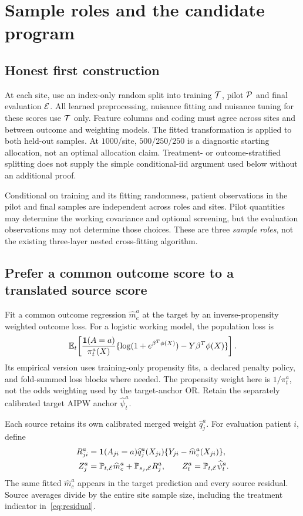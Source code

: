 \section{Sample roles and the candidate program}

\subsection{Honest first construction}
At each site, use an index-only random split into training $\mathcal T$, pilot
$\mathcal P$ and final evaluation $\mathcal E$. All learned preprocessing, nuisance
fitting and nuisance tuning for these scores use $\mathcal T$ only. Feature columns
and coding must agree across sites and between outcome and weighting models.
The fitted transformation is applied to both held-out samples. At
$1000$/site, $500/250/250$ is a diagnostic starting allocation, not an optimal
allocation claim. Treatment- or outcome-stratified splitting does not supply
the simple conditional-iid argument used below without an additional proof.

Conditional on training and its fitting randomness, patient observations in
the pilot and final samples are independent across roles and sites. Pilot
quantities may determine the working covariance and optional screening, but
the evaluation observations may not determine those choices. These are three
\emph{sample roles}, not the existing three-layer nested cross-fitting algorithm.

\subsection{Prefer a common outcome score to a translated source score}
Fit a common outcome regression $\widehat m_c^a$ at the target by an
inverse-propensity weighted outcome loss. For a logistic working model, the
population loss is
\[
 \mathbb E_t\!\left[\frac{\mathbf 1(A=a)}{\pi_t^a(X)}
 \{\log(1+e^{\beta^T\phi(X)})-Y\beta^T\phi(X)\}\right].
\]
Its empirical version uses training-only propensity fits, a declared penalty
policy, and fold-summed loss blocks where needed. The propensity weight here
is $1/\pi_t^a$, not the odds weighting used by the target-anchor OR. Retain
the separately calibrated target AIPW anchor $\widehat\psi_t^a$.

Each source retains its own calibrated merged weight $\widehat q_j^a$.
For evaluation patient $i$, define
\begin{align}
 R_{ji}^a&=\mathbf 1(A_{ji}=a)\widehat q_j^a(X_{ji})
                \{Y_{ji}-\widehat m_c^a(X_{ji})\},\label{eq:residual}\\
 Z_j^a&=\mathbb P_{t,\mathcal E}\widehat m_c^a
                 +\mathbb P_{s_j,\mathcal E}R_j^a,\qquad
 Z_t^a=\mathbb P_{t,\mathcal E}\widehat\psi_t^a.\label{eq:candidate}
\end{align}
The same fitted $\widehat m_c^a$ appears in the target prediction and every
source residual. Source averages divide by the entire site sample size,
including the treatment indicator in~\eqref{eq:residual}.

